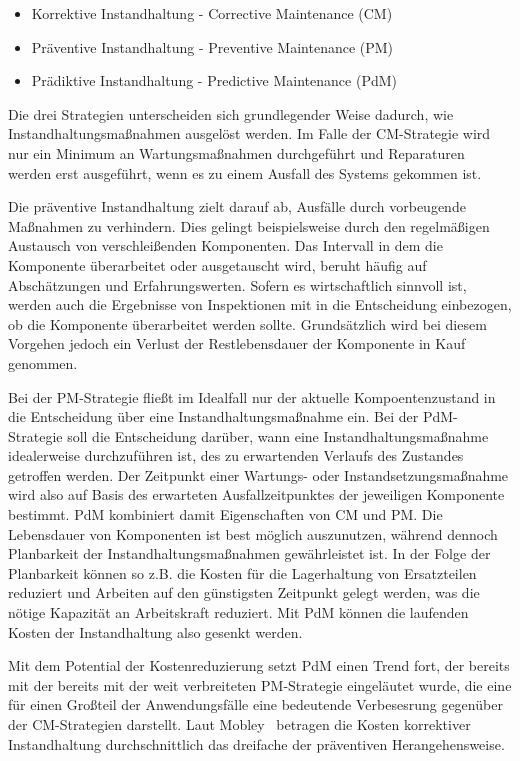 \begin{itemize}
    \item Korrektive Instandhaltung - Corrective Maintenance (CM)
    \item Präventive Instandhaltung - Preventive Maintenance (PM)
    \item Prädiktive Instandhaltung - Predictive Maintenance (PdM)
\end{itemize}

Die drei Strategien unterscheiden sich grundlegender Weise dadurch, wie Instandhaltungsmaßnahmen ausgelöst werden. Im Falle der CM-Strategie wird nur ein Minimum an Wartungsmaßnahmen durchgeführt und Reparaturen werden erst ausgeführt, wenn es zu einem Ausfall des Systems gekommen ist. 

Die präventive Instandhaltung zielt darauf ab, Ausfälle durch vorbeugende Maßnahmen zu verhindern. Dies gelingt beispielsweise durch den regelmäßigen Austausch von verschleißenden Komponenten. Das Intervall in dem die Komponente überarbeitet oder ausgetauscht wird, beruht häufig auf Abschätzungen und Erfahrungswerten. Sofern es wirtschaftlich sinnvoll ist, werden auch die Ergebnisse von Inspektionen mit in die Entscheidung einbezogen, ob die Komponente überarbeitet werden sollte. Grundsätzlich wird bei diesem Vorgehen jedoch ein Verlust der Restlebensdauer der Komponente in Kauf genommen. 

Bei der PM-Strategie fließt im Idealfall nur der aktuelle Kompoentenzustand in die Entscheidung über eine Instandhaltungsmaßnahme ein. Bei der PdM-Strategie soll die Entscheidung darüber, wann eine Instandhaltungsmaßnahme idealerweise durchzuführen ist, des zu erwartenden Verlaufs des Zustandes getroffen werden. Der Zeitpunkt einer Wartungs- oder Instandsetzungsmaßnahme wird also auf Basis des erwarteten Ausfallzeitpunktes der jeweiligen Komponente bestimmt. PdM kombiniert damit Eigenschaften von CM und PM. Die Lebensdauer von Komponenten ist best möglich auszunutzen, während dennoch Planbarkeit der Instandhaltungsmaßnahmen gewährleistet ist. In der Folge der Planbarkeit können so z.B. die Kosten für die Lagerhaltung von Ersatzteilen reduziert und Arbeiten auf den günstigsten Zeitpunkt gelegt werden, was die nötige Kapazität an Arbeitskraft reduziert. Mit PdM können die laufenden Kosten der Instandhaltung also gesenkt werden.

Mit dem Potential der Kostenreduzierung setzt PdM einen Trend fort, der bereits mit der bereits mit der weit verbreiteten PM-Strategie eingeläutet wurde, die eine für einen Großteil der Anwendungsfälle eine bedeutende Verbesesrung gegenüber der CM-Strategien darstellt. Laut Mobley~\cite{Mobley.2002} betragen die Kosten korrektiver Instandhaltung durchschnittlich das dreifache der präventiven Herangehensweise.

